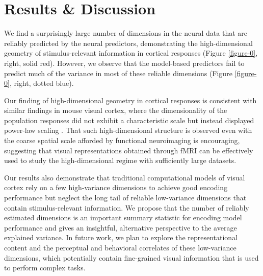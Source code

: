 \documentclass[10pt,letterpaper]{article}
\begin{document}
\section{Results \& Discussion}
We find a surprisingly large number of dimensions in the neural data that are reliably predicted by the neural predictors, demonstrating the high-dimensional geometry of stimulus-relevant information in cortical responses (Figure \ref{figure-0}, right, solid red). However, we observe that the model-based predictors fail to predict much of the variance in most of these reliable dimensions (Figure \ref{figure-0}, right, dotted blue).

Our finding of high-dimensional geometry in cortical responses is consistent with similar findings in mouse visual cortex, where the dimensionality of the population responses did not exhibit a characteristic scale but instead displayed power-law scaling \cite{Stringer2019}. That such high-dimensional structure is observed even with the coarse spatial scale afforded by functional neuroimaging is encouraging, suggesting that visual representations obtained through fMRI can be effectively used to study the high-dimensional regime with sufficiently large datasets.

Our results also demonstrate that traditional computational models of visual cortex rely on a few high-variance dimensions to achieve good encoding performance but neglect the long tail of reliable low-variance dimensions that contain stimulus-relevant information. We propose that the number of reliably estimated dimensions is an important summary statistic for encoding model performance and gives an insightful, alternative perspective to the average explained variance. In future work, we plan to explore the representational content and the perceptual and behavioral correlates of these low-variance dimensions, which potentially contain fine-grained visual information that is used to perform complex tasks.


\setlength{\bibleftmargin}{.125in}
\setlength{\bibindent}{-\bibleftmargin}


\end{document}
